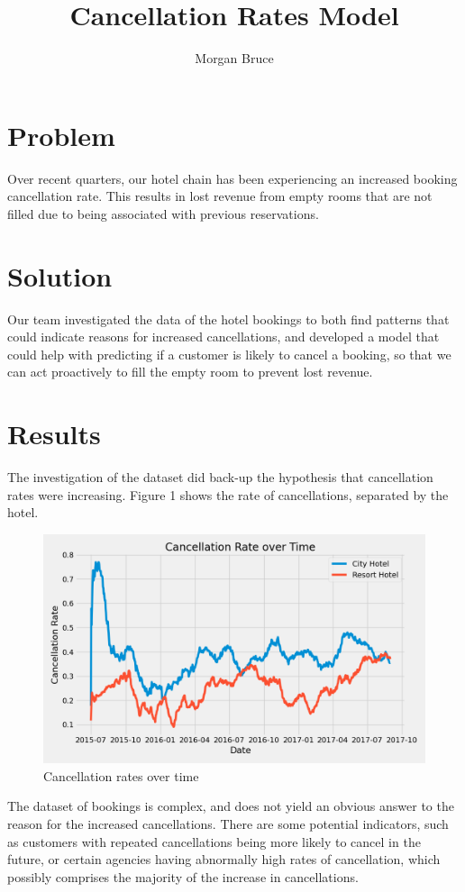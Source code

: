 \documentclass[12pt]{article}
\title{Cancellation Rates Model}
\author{Morgan Bruce}
\begin{document}
\maketitle

\section*{Problem}
Over recent quarters, our hotel chain has been experiencing an increased booking cancellation rate. This results in lost revenue from empty rooms that are not filled due to being associated with previous reservations.

\section*{Solution}
Our team investigated the data of the hotel bookings to both find patterns that could indicate reasons for increased cancellations, and developed a model that could help with predicting if a customer is likely to cancel a booking, so that we can act proactively to fill the empty room to prevent lost revenue.

\section*{Results}
The investigation of the dataset did back-up the hypothesis that cancellation rates were increasing. Figure 1 shows the rate of cancellations, separated by the hotel.

\begin{figure}
    \centering
    \includegraphics[scale=0.5]{cancel_rate_over_time.png}
    \caption{Cancellation rates over time}
\end{figure}

The dataset of bookings is complex, and does not yield an obvious answer to the reason for the increased cancellations. There are some potential indicators, such as customers with repeated cancellations being more likely to cancel in the future, or certain agencies having abnormally high rates of cancellation, which possibly comprises the majority of the increase in cancellations.
\end{document}

